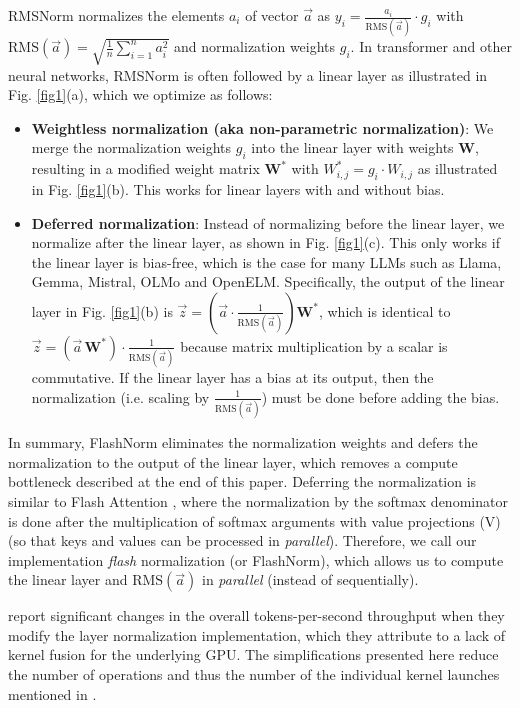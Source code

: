 \documentclass{article}
\newcommand{\mat}[1]{\mathbf{#1}}     %
\def\rms{\text{RMS}(\vec{a})}         %
\def\f1n{\frac{1}{n}}                 %
\def\sas{\sum_{i=1}^n a_i^2}           %
\def\W*{\mat{W}^\ast}                 %
\def\a{\vec{a}}                       %
\def\vz{\vec{z}}                      %
\begin{document}
RMSNorm \citep{rms} normalizes the elements  $a_i$ of vector $\a$ as $y_i = \frac{a_i}{\rms} \cdot g_i$ with $\rms = \sqrt{\f1n \sas}$ and normalization weights $g_i$. In transformer \citep{vanilla} and other neural networks, RMSNorm is often followed by a linear layer as illustrated in Fig. \ref{fig1}(a), which we optimize as follows:
\begin{itemize}[topsep=-1pt]
  \item \textbf{Weightless normalization (aka non-parametric normalization)}: We merge the normalization weights $g_i$ into the linear layer with weights $\mat{W}$, resulting in a modified weight matrix $\W*$ with $W_{i,j}^\ast = g_i \cdot W_{i,j}$ as illustrated in Fig. \ref{fig1}(b). This works for linear layers with and without bias.
  \item \textbf{Deferred normalization}: Instead of normalizing before the linear layer, we normalize after the linear layer, as shown in Fig. \ref{fig1}(c). This only works if the linear layer is bias-free, which is the case for many LLMs such as Llama, Gemma, Mistral, OLMo and OpenELM. Specifically, the output of the linear layer in Fig. \ref{fig1}(b) is $\vz = \left( \a \cdot \frac{1}{\rms} \right) \W*$, which is identical to $\vz = \left( \a \, \W* \right) \cdot \frac{1}{\rms}$ because matrix multiplication by a scalar is commutative. If the linear layer has a bias at its output, then the normalization (i.e. scaling by $\frac{1}{\rms}$) must be done before adding the bias.
\end{itemize}

In summary, FlashNorm eliminates the normalization weights and defers the normalization to the output of the linear layer, which removes a compute bottleneck described at the end of this paper. Deferring the normalization is similar to Flash Attention \citep{flash-attention}, where the normalization by the softmax denominator is done after the multiplication of softmax arguments with value projections (V) (so that keys and values can be processed in \emph{parallel}). Therefore, we call our implementation \emph{flash} normalization (or FlashNorm), which allows us to compute the linear layer and $\rms$ in \emph{parallel} (instead of sequentially).

\citeauthor{openelm} report significant changes in the overall tokens-per-second throughput when they modify the layer normalization implementation, which they attribute to a lack of kernel fusion for the underlying GPU. The simplifications presented here reduce the number of operations and thus the number of the individual kernel launches mentioned in \citep{openelm}.
\end{document}
